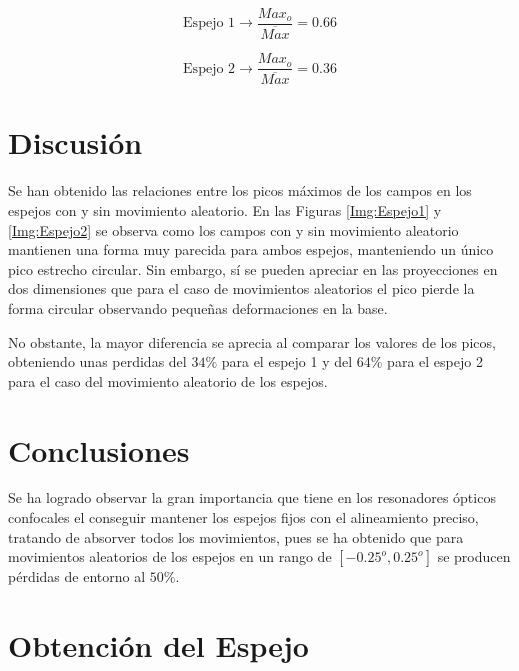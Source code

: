 \documentclass[twoside]{article}
\begin{document}
\begin{multicols}{2}
					\begin{equation}
						\textrm{Espejo 1} \rightarrow \frac {Max_o}{\overline{Max}} = 0.66
					\end{equation}

					\begin{equation}
						\textrm{Espejo 2} \rightarrow \frac {Max_o}{\overline{Max}} = 0.36
					\end{equation}

			\section{Discusión}

				Se han obtenido las relaciones entre los picos máximos de los campos en los espejos con y sin movimiento aleatorio. En las Figuras \ref{Img:Espejo1} y \ref{Img:Espejo2} se observa como los campos con y sin movimiento aleatorio mantienen una forma muy parecida para ambos espejos, manteniendo un único pico estrecho circular. Sin embargo, sí se pueden apreciar en las proyecciones en dos dimensiones que para el caso de movimientos aleatorios el pico pierde la forma circular observando pequeñas deformaciones en la base.

				No obstante, la mayor diferencia se aprecia al comparar los valores de los picos, obteniendo unas perdidas del $34\%$ para el espejo 1 y del $64\%$ para el espejo 2 para el caso del movimiento aleatorio de los espejos.

			\section{Conclusiones}

				Se ha logrado observar la gran importancia que tiene en los resonadores ópticos confocales el conseguir mantener los espejos fijos con el alineamiento preciso, tratando de absorver todos los movimientos, pues se ha obtenido que para movimientos aleatorios de los espejos en un rango de $[-0.25^o, 0.25^o]$ se producen pérdidas de entorno al $50\%$.

		\end{multicols}



		    \appendix

		    	\section{Obtención del Espejo}
		    		\label{appen:Espejo}
\end{document}
